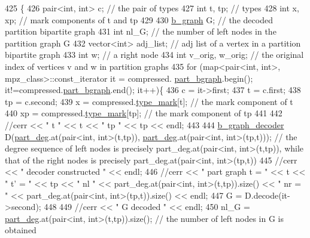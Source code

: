 \begin{DoxyCode}
425 \{
426   pair<int, int> c; \textcolor{comment}{// the pair of types}
427   \textcolor{keywordtype}{int} t, tp; \textcolor{comment}{// types}
428   \textcolor{keywordtype}{int} x, xp; \textcolor{comment}{// mark components of t and tp}
429 
430   \hyperlink{classb__graph}{b\_graph} G; \textcolor{comment}{// the decoded partition bipartite graph}
431   \textcolor{keywordtype}{int} nl\_G; \textcolor{comment}{// the number of left nodes in the partition graph G }
432   vector<int> adj\_list; \textcolor{comment}{// adj list of a vertex in a partition bipartite graph}
433   \textcolor{keywordtype}{int} w; \textcolor{comment}{// a right node}
434   \textcolor{keywordtype}{int} v\_orig, w\_orig; \textcolor{comment}{// the original index of vertices v and w in partition graphs }
435   \textcolor{keywordflow}{for} (map<pair<int, int>, mpz\_class>::const\_iterator it = compressed.
      \hyperlink{classmarked__graph__compressed_a7b3267063fba30b45eb21b3ba4e07536}{part\_bgraph}.begin(); it!=compressed.\hyperlink{classmarked__graph__compressed_a7b3267063fba30b45eb21b3ba4e07536}{part\_bgraph}.end(); it++)\{
436     c = it->first;
437     t = c.first;
438     tp = c.second;
439     x = compressed.\hyperlink{classmarked__graph__compressed_a86b00223525703e973415cbc9c94da68}{type\_mark}[t]; \textcolor{comment}{// the mark component of t}
440     xp = compressed.\hyperlink{classmarked__graph__compressed_a86b00223525703e973415cbc9c94da68}{type\_mark}[tp]; \textcolor{comment}{// the mark component of tp }
441 
442     \textcolor{comment}{//cerr << " t " << t << " tp " << tp << endl;}
443 
444     \hyperlink{classb__graph__decoder}{b\_graph\_decoder} D(\hyperlink{classmarked__graph__decoder_a6882e96fcad9abb10e72f1398814824a}{part\_deg}.at(pair<int, int>(t,tp)), 
      \hyperlink{classmarked__graph__decoder_a6882e96fcad9abb10e72f1398814824a}{part\_deg}.at(pair<int, int>(tp,t))); \textcolor{comment}{// the degree sequence of left nodes is precisely
       part\_deg.at(pair<int, int>(t,tp)), while that of the right nodes is precisely part\_deg.at(pair<int, int>(tp,t))}
445     \textcolor{comment}{//cerr << " decoder constructed " << endl;}
446     \textcolor{comment}{//cerr << " part graph t = "  << t << " t' = " << tp << " nl " << part\_deg.at(pair<int,
       int>(t,tp)).size() << " nr = " << part\_deg.at(pair<int, int>(tp,t)).size() << endl;}
447     G = D.decode(it->second);
448 
449     \textcolor{comment}{//cerr << " G decoded " << endl;}
450     nl\_G = \hyperlink{classmarked__graph__decoder_a6882e96fcad9abb10e72f1398814824a}{part\_deg}.at(pair<int, int>(t,tp)).size(); \textcolor{comment}{// the number of left nodes in G is obtained
}
\end{DoxyCode}
